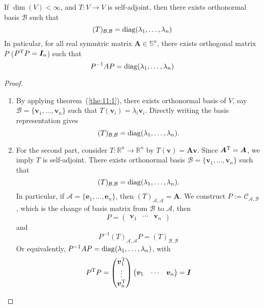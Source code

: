 \begin{corollary}
If $\dim(V)<\infty$, and $T:V\to V$ is self-adjoint, then there exists orthonormal basis $\mathcal{B}$ such that
\[
(T)_{\mathcal{B},\mathcal{B}}=\operatorname{diag}(\lambda_1,\dots,\lambda_n)
\]
In paticular, for all real symmtric matrix $\bm A\in\mathbb{S}^n$, there exists orthogonal matrix $P$ ($P^{\mathrm T} P=\bm I_n$) such that
\[
P^{-1}AP=\operatorname{diag}(\lambda_1,\dots,\lambda_n)
\]
\end{corollary}
\begin{proof}
\begin{enumerate}
\item
By applying theorem~(\ref{the:11:1}), there exists orthonormal basis of $V$, say $\mathcal{B}=\{\bm v_1,\dots,\bm v_n\}$ such that $T(\bm v_i)=\lambda_i\bm v_i$. Directly writing the basis representation gives
\[
(T)_{\mathcal{B},\mathcal{B}}=\operatorname{diag}(\lambda_1,\dots,\lambda_n).
\]
\item
For the second part, consider $T:\mathbb{R}^n\to\mathbb{R}^n$ by $T(\bm v)=\bm A\bm v$.
Since $\bm A^{\mathrm T}=\bm A$, we imply $T$ is self-adjoint.
There exists orthonormal basis $\mathcal{B}=\{\bm v_1,\dots,\bm v_n\}$ such that
\[
(T)_{\mathcal{B},\mathcal{B}}=\operatorname{diag}(\lambda_1,\dots,\lambda_n).
\]
In particular, if $\mathcal{A}=\{\bm e_1,\dots,\bm e_n\}$, then $(T)_{\mathcal{A},\mathcal{A}}=\bm A$.
We construct $P:=\mathcal{C}_{\mathcal{A},\mathcal{B}}$, which is the change of basis matrix from $\mathcal{B}$ to $\mathcal{A}$, then
\[
P=\begin{pmatrix}
\bm v_1&\cdots&\bm v_n
\end{pmatrix}
\]
and 
\[
P^{-1}(T)_{\mathcal{A},\mathcal{A}}P=(T)_{\mathcal{B},\mathcal{B}}
\]
Or equivalently, $P^{-1}AP=\operatorname{diag}(\lambda_1,\dots,\lambda_n)$, with 
\[
P^{\mathrm T} P=\begin{pmatrix}
\bm v_1^{\mathrm T}\\\vdots\\\bm v_n^{\mathrm T}
\end{pmatrix}\begin{pmatrix}
\bm v_1&\cdots&\bm v_n
\end{pmatrix}=\bm I
\]
\end{enumerate}
\end{proof}
